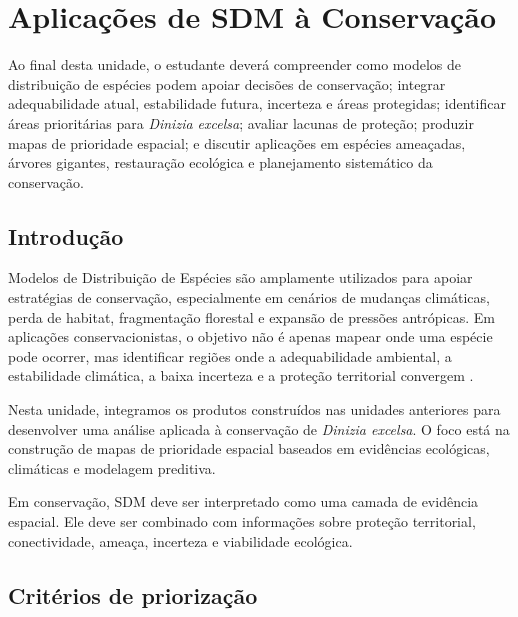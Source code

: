 \chapter[Aplicações à conservação]{Aplicações de SDM à Conservação}

\begin{objetivos}
	Ao final desta unidade, o estudante deverá compreender como modelos de distribuição de espécies podem apoiar decisões de conservação; integrar adequabilidade atual, estabilidade futura, incerteza e áreas protegidas; identificar áreas prioritárias para \textit{Dinizia excelsa}; avaliar lacunas de proteção; produzir mapas de prioridade espacial; e discutir aplicações em espécies ameaçadas, árvores gigantes, restauração ecológica e planejamento sistemático da conservação.
\end{objetivos}

\section{Introdução}

Modelos de Distribuição de Espécies são amplamente utilizados para apoiar estratégias de conservação, especialmente em cenários de mudanças climáticas, perda de habitat, fragmentação florestal e expansão de pressões antrópicas. Em aplicações conservacionistas, o objetivo não é apenas mapear onde uma espécie pode ocorrer, mas identificar regiões onde a adequabilidade ambiental, a estabilidade climática, a baixa incerteza e a proteção territorial convergem \parencite{margules2000systematic,moilanen2009spatial,franklin2023,guisan2017habitat,zurell2020benchmarking}.

Nesta unidade, integramos os produtos construídos nas unidades anteriores para desenvolver uma análise aplicada à conservação de \textit{Dinizia excelsa}. O foco está na construção de mapas de prioridade espacial baseados em evidências ecológicas, climáticas e modelagem preditiva.

\begin{conceito}[title={\faBook\quad SDM aplicado à conservação}]
	Em conservação, SDM deve ser interpretado como uma camada de evidência espacial. Ele deve ser combinado com informações sobre proteção territorial, conectividade, ameaça, incerteza e viabilidade ecológica.
\end{conceito}

\section{Critérios de priorização}

